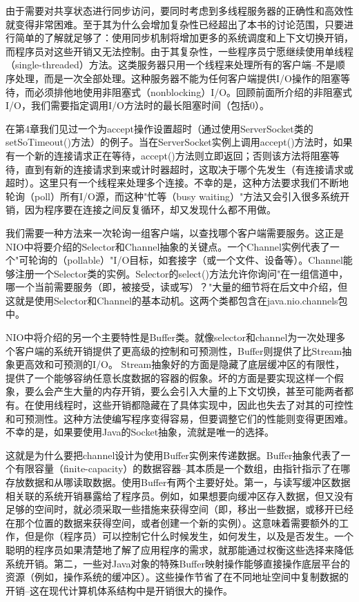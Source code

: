 	由于需要对共享状态进行同步访问，要同时考虑到多线程服务器的正确性和高效性就变得非常困难。至于其为什么会增加复杂性已经超出了本书的讨论范围，只要进行简单的了解就足够了：使用同步机制将增加更多的系统调度和上下文切换开销，而程序员对这些开销又无法控制。由于其复杂性，一些程序员宁愿继续使用单线程（single-threaded）方法。这类服务器只用一个线程来处理所有的客户端--不是顺序处理，而是一次全部处理。这种服务器不能为任何客户端提供I/O操作的阻塞等待，而必须排他地使用非阻塞式（nonblocking）I/O。回顾前面所介绍的非阻塞式I/O，我们需要指定调用I/O方法时的最长阻塞时间（包括0）。 

	在第4章我们见过一个为accept操作设置超时（通过使用ServerSocket类的setSoTimeout()方法）的例子。当在ServerSocket实例上调用accept()方法时，如果有一个新的连接请求正在等待，accept()方法则立即返回；否则该方法将阻塞等待，直到有新的连接请求到来或计时器超时，这取决于哪个先发生（有连接请求或超时）。这里只有一个线程来处理多个连接。不幸的是，这种方法要求我们不断地轮询（poll）所有I/O源，而这种"忙等（busy waiting）"方法又会引入很多系统开销，因为程序要在连接之间反复循环，却又发现什么都不用做。 

	我们需要一种方法来一次轮询一组客户端，以查找哪个客户端需要服务。这正是NIO中将要介绍的Selector和Channel抽象的关键点。一个Channel实例代表了一个"可轮询的（pollable）"I/O目标，如套接字（或一个文件、设备等）。Channel能够注册一个Selector类的实例。Selector的select()方法允许你询问"在一组信道中，哪一个当前需要服务（即，被接受，读或写）？"大量的细节将在后文中介绍，但这就是使用Selector和Channel的基本动机。这两个类都包含在java.nio.channels包中。 

	NIO中将介绍的另一个主要特性是Buffer类。就像selector和channel为一次处理多个客户端的系统开销提供了更高级的控制和可预测性，Buffer则提供了比Stream抽象更高效和可预测的I/O。 Stream抽象好的方面是隐藏了底层缓冲区的有限性，提供了一个能够容纳任意长度数据的容器的假象。坏的方面是要实现这样一个假象，要么会产生大量的内存开销，要么会引入大量的上下文切换，甚至可能两者都有。在使用线程时，这些开销都隐藏在了具体实现中，因此也失去了对其的可控性和可预测性。这种方法使编写程序变得容易，但要调整它们的性能则变得更困难。不幸的是，如果要使用Java的Socket抽象，流就是唯一的选择。 

	这就是为什么要把channel设计为使用Buffer实例来传递数据。Buffer抽象代表了一个有限容量（finite-capacity）的数据容器--其本质是一个数组，由指针指示了在哪存放数据和从哪读取数据。使用Buffer有两个主要好处。第一，与读写缓冲区数据相关联的系统开销暴露给了程序员。例如，如果想要向缓冲区存入数据，但又没有足够的空间时，就必须采取一些措施来获得空间（即，移出一些数据，或移开已经在那个位置的数据来获得空间，或者创建一个新的实例）。这意味着需要额外的工作，但是你（程序员）可以控制它什么时候发生，如何发生，以及是否发生。一个聪明的程序员如果清楚地了解了应用程序的需求，就那能通过权衡这些选择来降低系统开销。第二，一些对Java对象的特殊Buffer映射操作能够直接操作底层平台的资源（例如，操作系统的缓冲区）。这些操作节省了在不同地址空间中复制数据的开销--这在现代计算机体系结构中是开销很大的操作。 

